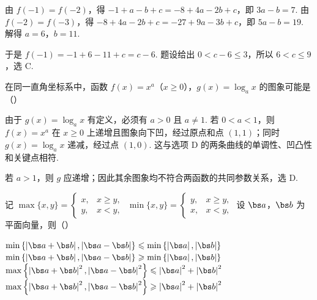\begin{solution}
由 \(f(-1)=f(-2)\)，得 \(-1+a-b+c=-8+4a-2b+c\)，即 \(3a-b=7\). 由 \(f(-2)=f(-3)\)，得 \(-8+4a-2b+c=-27+9a-3b+c\)，即 \(5a-b=19\). 解得 \(a=6\)，\(b=11\).

于是 \(f(-1)=-1+6-11+c=c-6\). 题设给出 \(0<c-6\leqslant3\)，所以 \(6<c\leqslant9\)，选 C.
\end{solution}

\begin{problem}
在同一直角坐标系中，函数 \(f(x) = x^a\)（\(x \geqslant 0\)），\( g(x) = \log_a x \) 的图象可能是（\quad）

    {}
    {}
    {}
\end{problem}

\begin{solution}
由于 \(g(x)=\log_a x\) 有定义，必须有 \(a>0\) 且 \(a\neq1\). 若 \(0<a<1\)，则 \(f(x)=x^a\) 在 \(x\geqslant0\) 上递增且图象向下凹，经过原点和点 \((1,1)\)；同时 \(g(x)=\log_a x\) 递减，经过点 \((1,0)\). 这与选项 D 的两条曲线的单调性、凹凸性和关键点相符.

若 \(a>1\)，则 \(g\) 应递增；因此其余图象均不符合两函数的共同参数关系，选 D.
\end{solution}

\begin{problem}
记 \( \max\{x, y\} = \begin{cases}
x, & x \geqslant y,\\
y, & x < y,
\end{cases} \) \( \min\{x, y\} = \begin{cases}
y, & x \geqslant y,\\
x, & x < y,
\end{cases} \) 设 \(\bs a\)，\(\bs b\) 为平面向量，则（\quad）

\choices
    {\(\min \left\{\left|\bs a + \bs b\right|, \left|\bs a - \bs b\right|\right\} \leqslant \min \left\{\left|\bs a\right|, \left|\bs b\right|\right\}\)}
    {\(\min \left\{\left|\bs a + \bs b\right|, \left|\bs a - \bs b\right|\right\} \geqslant \min \left\{\left|\bs a\right|, \left|\bs b\right|\right\}\)}
    {\(\max \left\{\left|\bs a + \bs b\right|^2, \left|\bs a - \bs b\right|^2\right\} \leqslant \left|\bs a\right|^2 + \left|\bs b\right|^2\)}
    {\(\max \left\{\left|\bs a + \bs b\right|^2, \left|\bs a - \bs b\right|^2\right\} \geqslant \left|\bs a\right|^2 + \left|\bs b\right|^2\)}
\end{problem}

